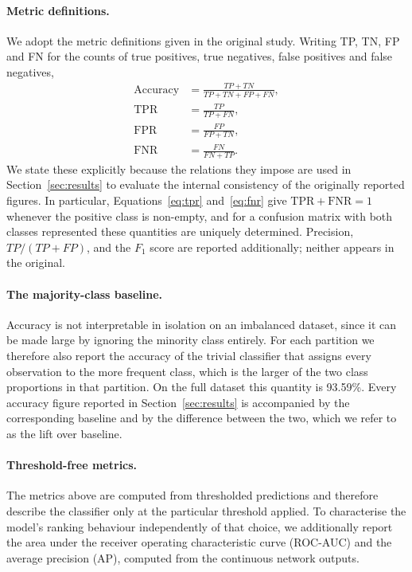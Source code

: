 \paragraph{Metric definitions.} We adopt the metric definitions given in the
original study. Writing TP, TN, FP and FN for the counts of true positives,
true negatives, false positives and false negatives,
\begin{align}
\mathrm{Accuracy} &= \frac{TP + TN}{TP + TN + FP + FN}, \label{eq:acc}\\[2pt]
\mathrm{TPR} &= \frac{TP}{TP + FN}, \label{eq:tpr}\\[2pt]
\mathrm{FPR} &= \frac{FP}{FP + TN}, \label{eq:fpr}\\[2pt]
\mathrm{FNR} &= \frac{FN}{FN + TP}. \label{eq:fnr}
\end{align}
We state these explicitly because the relations they impose are used in
Section~\ref{sec:results} to evaluate the internal consistency of the
originally reported figures. In particular,
Equations~\eqref{eq:tpr} and~\eqref{eq:fnr} give
$\mathrm{TPR} + \mathrm{FNR} = 1$ whenever the positive class is non-empty, and
for a confusion matrix with both classes represented these quantities are
uniquely determined. Precision, $TP/(TP+FP)$, and the $F_1$ score are reported
additionally; neither appears in the original.

\paragraph{The majority-class baseline.} Accuracy is not interpretable in
isolation on an imbalanced dataset, since it can be made large by ignoring the
minority class entirely. For each partition we therefore also report the
accuracy of the trivial classifier that assigns every observation to the more
frequent class, which is the larger of the two class proportions in that
partition. On the full dataset this quantity is 93.59\%. Every accuracy figure
reported in Section~\ref{sec:results} is accompanied by the corresponding
baseline and by the difference between the two, which we refer to as the lift
over baseline.

\paragraph{Threshold-free metrics.} The metrics above are computed from
thresholded predictions and therefore describe the classifier only at the
particular threshold applied. To characterise the model's ranking behaviour
independently of that choice, we additionally report the area under the
receiver operating characteristic curve (ROC-AUC) and the average precision
(AP), computed from the continuous network outputs.

